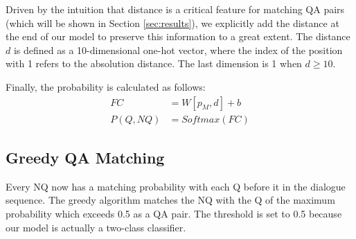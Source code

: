 Driven by the intuition that distance is a critical feature 
for matching QA pairs (which will be shown in Section \ref{sec:results}), 
we explicitly add the distance at the end of our model to preserve 
this information to a great extent. The distance $d$ is defined as 
a 10-dimensional one-hot vector, where the index of the position with 
1 refers to the absolution distance. The last dimension is 1 when $d\geq 10$.

Finally, the probability is calculated as follows:
\begin{equation}
\begin{aligned}
FC&=W[p_M,d]+b\\
P(Q,NQ)&=Softmax(FC)
\end{aligned}
\end{equation}

\subsection{Greedy QA Matching}

Every NQ now has a matching probability with each Q 
before it in the dialogue sequence. The greedy algorithm matches the NQ with the
Q of the maximum probability which exceeds 0.5 as a QA pair. 
The threshold is set to 0.5 because our model is actually a two-class classifier.













